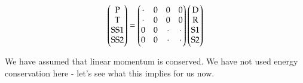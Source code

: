 \begin{equation}
    \begin{pmatrix}\text{P} \\ \text{T} \\ \text{SS1} \\ \text{SS2}\end{pmatrix} = \begin{pmatrix}\cdot & 0 & 0 & 0 \\ \cdot & 0 & 0 & 0 \\ 0 & 0 & \cdot & \cdot \\ 0 & 0 & \cdot & \cdot\end{pmatrix}\begin{pmatrix}\text{D} \\ \text{R} \\ \text{S1} \\ \text{S2}\end{pmatrix}
\end{equation}

We have assumed that linear momentum is conserved. We have not used energy conservation here - let's see what this implies for us now.


